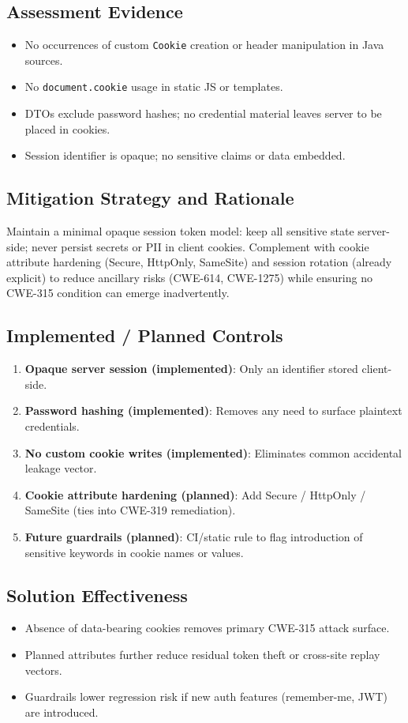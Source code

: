 \documentclass[]{UCD_CS_FYP_Report}
\begin{document}
\subsection*{Assessment Evidence}
\begin{itemize}
	\item No occurrences of custom \texttt{Cookie} creation or header manipulation in Java sources.
	\item No \texttt{document.cookie} usage in static JS or templates.
	\item DTOs exclude password hashes; no credential material leaves server to be placed in cookies.
	\item Session identifier is opaque; no sensitive claims or data embedded.
\end{itemize}

\subsection*{Mitigation Strategy and Rationale}
Maintain a minimal opaque session token model: keep all sensitive state server-side; never persist secrets or PII in client cookies. Complement with cookie attribute hardening (Secure, HttpOnly, SameSite) and session rotation (already explicit) to reduce ancillary risks (CWE-614, CWE-1275) while ensuring no CWE-315 condition can emerge inadvertently.

\subsection*{Implemented / Planned Controls}
\begin{enumerate}
	\item \textbf{Opaque server session (implemented)}: Only an identifier stored client-side.
	\item \textbf{Password hashing (implemented)}: Removes any need to surface plaintext credentials.
	\item \textbf{No custom cookie writes (implemented)}: Eliminates common accidental leakage vector.
	\item \textbf{Cookie attribute hardening (planned)}: Add Secure / HttpOnly / SameSite (ties into CWE-319 remediation).
	\item \textbf{Future guardrails (planned)}: CI/static rule to flag introduction of sensitive keywords in cookie names or values.
\end{enumerate}

\subsection*{Solution Effectiveness}
\begin{itemize}
	\item Absence of data-bearing cookies removes primary CWE-315 attack surface.
	\item Planned attributes further reduce residual token theft or cross-site replay vectors.
	\item Guardrails lower regression risk if new auth features (remember-me, JWT) are introduced.
\end{itemize}
\end{document}
